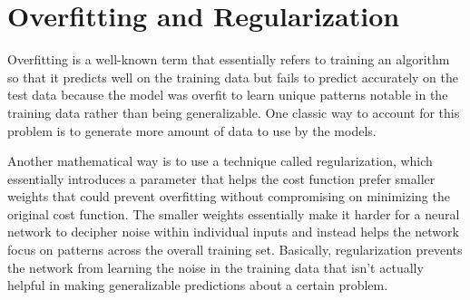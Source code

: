 \documentclass[11pt]{article}
\theoremstyle{definition}
\begin{document}
\section{Overfitting and Regularization}
Overfitting is a well-known term that essentially refers to training an algorithm so that it predicts well on the training data but fails to predict accurately on the test data because the model was overfit to learn unique patterns notable in the training data rather than being generalizable. One classic way to account for this problem is to generate more amount of data to use by the models.

Another mathematical way is to use a technique called regularization, which essentially introduces a parameter that helps the cost function prefer smaller weights that could prevent overfitting without compromising on minimizing the original cost function. The smaller weights essentially make it harder for a neural network to decipher noise within individual inputs and instead helps the network focus on patterns across the overall training set. Basically, regularization prevents the network from learning the noise in the training data that isn't actually helpful in making generalizable predictions about a certain problem.
\end{document}
